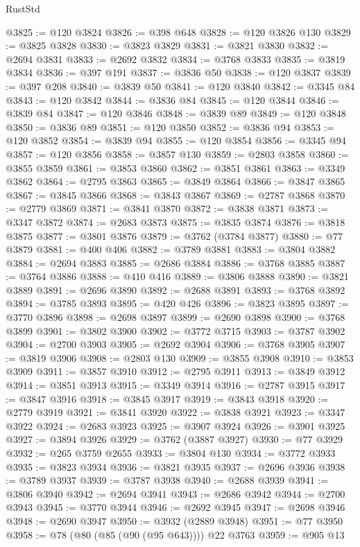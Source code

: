 \begin{lexlean}{RustStd}
\begin{coremodule}
{\begin{coremodule}
{{{{{{{{{{{{{{{{{{{{{{{{{{{{{{{{{{{{{{{{{{{{{{{{{{{{{{{{{{{{@3825 := @120 @3824
@3826 := @398 @648
@3828 := @120 @3826 @130
@3829 := @3825 @3828
@3830 := @3823 @3829
@3831 := @3821 @3830
@3832 := @2694 @3831
@3833 := @2692 @3832
@3834 := @3768 @3833
@3835 := @3819 @3834
@3836 := @397 @191
@3837 := @3836 @50
@3838 := @120 @3837
@3839 := @397 @208
@3840 := @3839 @50
@3841 := @120 @3840
@3842 := @3345 @84
@3843 := @120 @3842
@3844 := @3836 @84
@3845 := @120 @3844
@3846 := @3839 @84
@3847 := @120 @3846
@3848 := @3839 @89
@3849 := @120 @3848
@3850 := @3836 @89
@3851 := @120 @3850
@3852 := @3836 @94
@3853 := @120 @3852
@3854 := @3839 @94
@3855 := @120 @3854
@3856 := @3345 @94
@3857 := @120 @3856
@3858 := @3857 @130
@3859 := @2803 @3858
@3860 := @3855 @3859
@3861 := @3853 @3860
@3862 := @3851 @3861
@3863 := @3349 @3862
@3864 := @2795 @3863
@3865 := @3849 @3864
@3866 := @3847 @3865
@3867 := @3845 @3866
@3868 := @3843 @3867
@3869 := @2787 @3868
@3870 := @2779 @3869
@3871 := @3841 @3870
@3872 := @3838 @3871
@3873 := @3347 @3872
@3874 := @2683 @3873
@3875 := @3835 @3874
@3876 := @3818 @3875
@3877 := @3801 @3876
@3879 := @3762 (@3784 @3877)
@3880 := @77 @3879
@3881 := @400 @406
@3882 := @3789 @3881
@3883 := @3804 @3882
@3884 := @2694 @3883
@3885 := @2686 @3884
@3886 := @3768 @3885
@3887 := @3764 @3886
@3888 := @410 @416
@3889 := @3806 @3888
@3890 := @3821 @3889
@3891 := @2696 @3890
@3892 := @2688 @3891
@3893 := @3768 @3892
@3894 := @3785 @3893
@3895 := @420 @426
@3896 := @3823 @3895
@3897 := @3770 @3896
@3898 := @2698 @3897
@3899 := @2690 @3898
@3900 := @3768 @3899
@3901 := @3802 @3900
@3902 := @3772 @3715
@3903 := @3787 @3902
@3904 := @2700 @3903
@3905 := @2692 @3904
@3906 := @3768 @3905
@3907 := @3819 @3906
@3908 := @2803 @130
@3909 := @3855 @3908
@3910 := @3853 @3909
@3911 := @3857 @3910
@3912 := @2795 @3911
@3913 := @3849 @3912
@3914 := @3851 @3913
@3915 := @3349 @3914
@3916 := @2787 @3915
@3917 := @3847 @3916
@3918 := @3845 @3917
@3919 := @3843 @3918
@3920 := @2779 @3919
@3921 := @3841 @3920
@3922 := @3838 @3921
@3923 := @3347 @3922
@3924 := @2683 @3923
@3925 := @3907 @3924
@3926 := @3901 @3925
@3927 := @3894 @3926
@3929 := @3762 (@3887 @3927)
@3930 := @77 @3929
@3932 := @265 @3759 @2655
@3933 := @3804 @130
@3934 := @3772 @3933
@3935 := @3823 @3934
@3936 := @3821 @3935
@3937 := @2696 @3936
@3938 := @3789 @3937
@3939 := @3787 @3938
@3940 := @2688 @3939
@3941 := @3806 @3940
@3942 := @2694 @3941
@3943 := @2686 @3942
@3944 := @2700 @3943
@3945 := @3770 @3944
@3946 := @2692 @3945
@3947 := @2698 @3946
@3948 := @2690 @3947
@3950 := @3932 (@2889 @3948)
@3951 := @77 @3950
@3958 := @78 (@80 (@85 (@90 (@95 @643)))) @22 @3763
@3959 := @905 @13
}}}}}}}}}}}}}}}}}}}}}}}}}}}}}}}}}}}}}}}}}}}}}}}}}}}}}}}}}}}}
\end{coremodule}}
\end{coremodule}
\end{lexlean}
